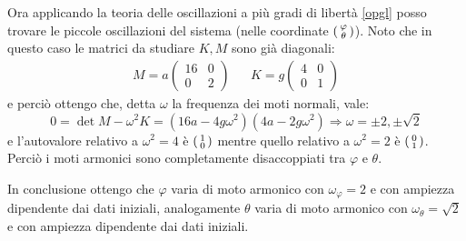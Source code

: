 \documentclass[../main.tex]{subfiles}
\begin{document}
Ora applicando la teoria delle oscillazioni a più gradi di libertà \cref{opgl} posso trovare le piccole oscillazioni del sistema (nelle coordinate $\begin{psmallmatrix}\varphi \\ \theta\end{psmallmatrix}$).
Noto che in questo caso le matrici da studiare $K,M$ sono già diagonali:
\begin{align*}
	M=a\begin{pmatrix}
		16 & 0 \\
		0  & 2
	\end{pmatrix}
	& &
	K=g\begin{pmatrix}
		4 & 0 \\
		0 & 1
	\end{pmatrix}
\end{align*}
e perciò ottengo che, detta $\omega$ la frequenza dei moti normali, vale:
\begin{equation*}
	0=\det M-\omega^2K=(16a-4g\omega^2)(4a-2g\omega^2) \Rightarrow \omega=\pm2,\pm\sqrt2
\end{equation*}
e l'autovalore relativo a $\omega^2=4$ è $\begin{psmallmatrix}1 \\ 0\end{psmallmatrix}$ mentre quello relativo a $\omega^2=2$ è $\begin{psmallmatrix}0 \\ 1\end{psmallmatrix}$. Perciò i moti armonici sono completamente disaccoppiati tra $\varphi$ e $\theta$.

In conclusione ottengo che $\varphi$ varia di moto armonico con $\omega_\varphi=2$ e con ampiezza dipendente dai dati iniziali, analogamente $\theta$ varia di moto armonico con $\omega_\theta=\sqrt2$ e con ampiezza dipendente dai dati iniziali.
\end{document}
